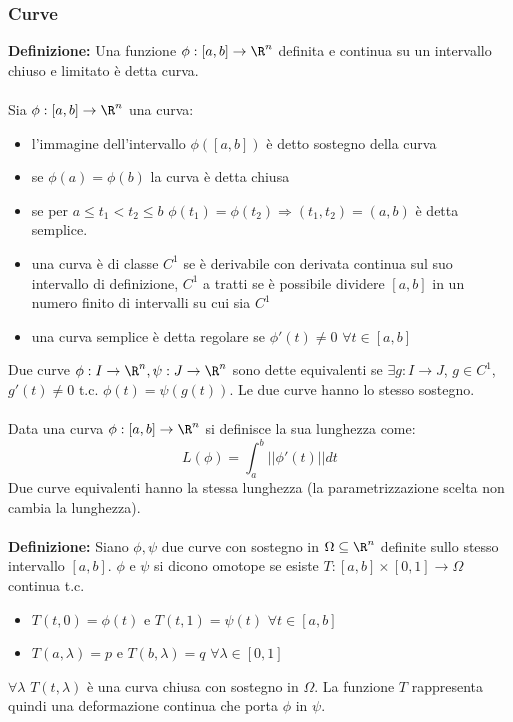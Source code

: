 \documentclass{article}
\begin{document}
\subsubsection{Curve}
\textbf{Definizione:} Una funzione $\phi:[a,b]\rightarrow\R^n$ definita e continua su un intervallo chiuso e limitato è detta curva.\\\\
Sia $\phi:[a,b]\rightarrow\R^n$ una curva:
\begin{itemize}
    \item l'immagine dell'intervallo $\phi([a,b])$ è detto sostegno della curva
    \item se $\phi(a)=\phi(b)$ la curva è detta chiusa
    \item se per $a\leq t_1<t_2\leq b$ $\phi(t_1)=\phi(t_2)\Rightarrow (t_1,t_2)=(a,b)$ è detta semplice.
    \item una curva è di classe $C^1$ se è derivabile con derivata continua sul suo intervallo di definizione, $C^1$ a tratti se è possibile dividere $[a,b]$ in un numero finito di intervalli su cui sia $C^1$
    \item una curva semplice è detta regolare se $\phi'(t)\neq0$ $\forall t\in[a,b]$
\end{itemize}
Due curve $\phi:I\rightarrow\R^n,\psi:J\rightarrow\R^n$ sono dette equivalenti se $\exists g:I\rightarrow J$, $g\in C^1$, $g'(t)\neq0$ t.c. $\phi(t)=\psi(g(t))$. Le due curve hanno lo stesso sostegno.\\\\
Data una curva $\phi:[a,b]\rightarrow\R^n$ si definisce la sua lunghezza come:
$$ L(\phi)=\int_a^b||\phi'(t)||dt $$
Due curve equivalenti hanno la stessa lunghezza (la parametrizzazione scelta non cambia la lunghezza).\\\\
\textbf{Definizione:} Siano $\phi,\psi$ due curve con sostegno in $\Omega\subseteq\R^n$ definite sullo stesso intervallo $[a,b]$. $\phi$ e $\psi$ si dicono omotope se esiste $T:[a,b]\times[0,1]\rightarrow\Omega$ continua t.c.
\begin{itemize}
    \item $T(t,0)=\phi(t)$ e $T(t,1)=\psi(t)$ $\forall t\in[a,b]$
    \item $T(a,\lambda)=p$ e $T(b,\lambda)=q$ $\forall\lambda\in[0,1]$
\end{itemize}
$\forall\lambda$ $T(t,\lambda)$ è una curva chiusa con sostegno in $\Omega$. La funzione $T$ rappresenta quindi una deformazione continua che porta $\phi$ in $\psi$.
\end{document}
